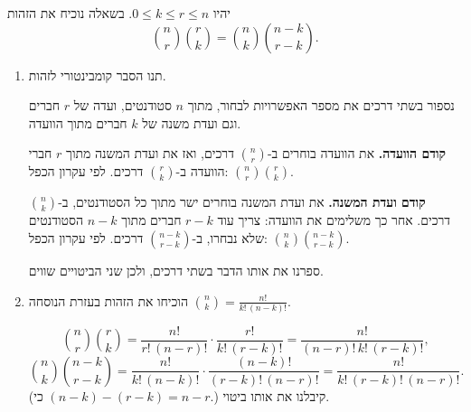 יהיו $0\le k\le r\le n$. בשאלה נוכיח את הזהות
\[
\binom nr\binom rk=\binom nk\binom{n-k}{r-k}.
\]
\begin{enumerate}
\item תנו הסבר קומבינטורי לזהות.
\begin{solbox}
נספור בשתי דרכים את מספר האפשרויות לבחור, מתוך $n$ סטודנטים, ועדה של $r$ חברים וגם ועדת משנה של $k$ חברים מתוך הוועדה.

\textbf{קודם הוועדה.} את הוועדה בוחרים ב-$\binom nr$ דרכים, ואז את ועדת המשנה מתוך $r$ חברי הוועדה ב-$\binom rk$ דרכים. לפי עקרון הכפל: $\binom nr\binom rk$.

\textbf{קודם ועדת המשנה.} את ועדת המשנה בוחרים ישר מתוך כל הסטודנטים, ב-$\binom nk$ דרכים. אחר כך משלימים את הוועדה: צריך עוד $r-k$ חברים מתוך $n-k$ הסטודנטים שלא נבחרו, ב-$\binom{n-k}{r-k}$ דרכים. לפי עקרון הכפל: $\binom nk\binom{n-k}{r-k}$.

ספרנו את אותו הדבר בשתי דרכים, ולכן שני הביטויים שווים.
\end{solbox}
\item הוכיחו את הזהות בעזרת הנוסחה $\binom nk=\frac{n!}{k!\,(n-k)!}$.
\begin{solbox}
\[
\binom nr\binom rk=\frac{n!}{r!\,(n-r)!}\cdot\frac{r!}{k!\,(r-k)!}=\frac{n!}{(n-r)!\,k!\,(r-k)!},
\]
\[
\binom nk\binom{n-k}{r-k}=\frac{n!}{k!\,(n-k)!}\cdot\frac{(n-k)!}{(r-k)!\,(n-r)!}=\frac{n!}{k!\,(r-k)!\,(n-r)!}.
\]
(כי $(n-k)-(r-k)=n-r$.) קיבלנו את אותו ביטוי.
\end{solbox}
\end{enumerate}
